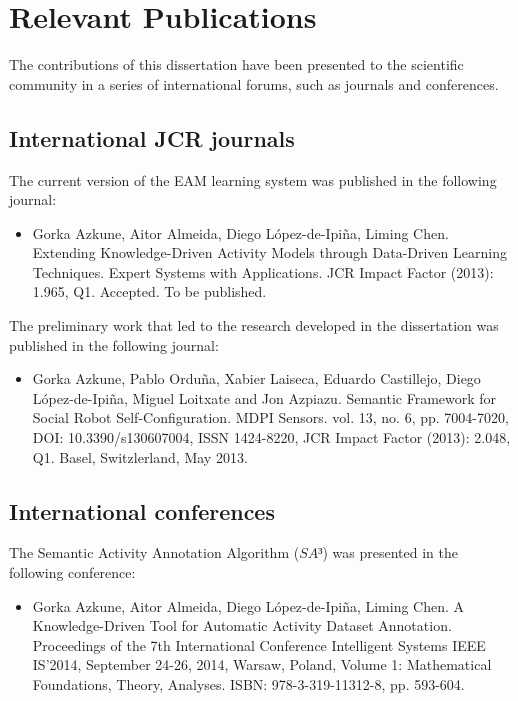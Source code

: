 \section{Relevant Publications}
\label{sec:conclusions:pub}

The contributions of this dissertation have been presented to the scientific community in a series of international forums, such as journals and conferences.

\subsection{International JCR journals}

The current version of the EAM learning system was published in the following journal:

\begin{itemize}
 \item Gorka Azkune, Aitor Almeida, Diego López-de-Ipiña, Liming Chen. Extending Knowledge-Driven Activity Models through Data-Driven Learning Techniques. Expert Systems with Applications. JCR Impact Factor (2013): 1.965, Q1. Accepted. To be published.
\end{itemize}

The preliminary work that led to the research developed in the dissertation was published in the following journal:

\begin{itemize}
 \item Gorka Azkune, Pablo Orduña, Xabier Laiseca, Eduardo Castillejo, Diego López-de-Ipiña, Miguel Loitxate and Jon Azpiazu. Semantic Framework for Social Robot Self-Configuration. MDPI Sensors. vol. 13, no. 6, pp. 7004-7020, DOI: 10.3390/s130607004, ISSN 1424-8220, JCR Impact Factor (2013): 2.048, Q1. Basel, Switzlerland, May 2013.
\end{itemize}

\subsection{International conferences}

The Semantic Activity Annotation Algorithm ($SA³$) was presented in the following conference:

\begin{itemize}
 \item Gorka Azkune, Aitor Almeida, Diego López-de-Ipiña, Liming Chen. A Knowledge-Driven Tool for Automatic Activity Dataset Annotation. Proceedings of the 7th International Conference Intelligent Systems IEEE IS’2014, September 24-26, 2014, Warsaw, Poland, Volume 1: Mathematical Foundations, Theory, Analyses. ISBN: 978-3-319-11312-8, pp. 593-604.
\end{itemize}

